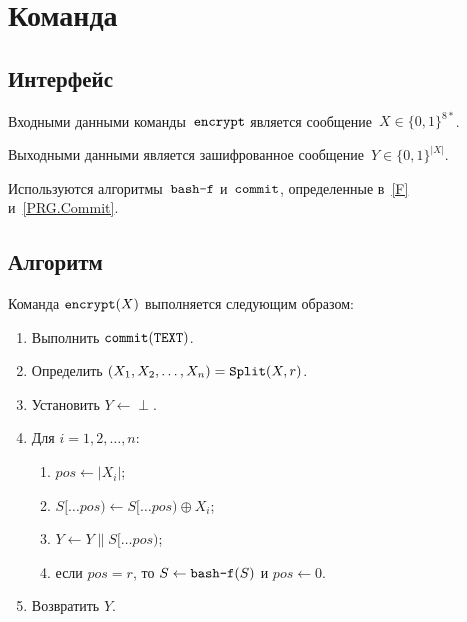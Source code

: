 \section{Команда }\label{PRG.Encrypt}

\subsection{Интерфейс}\label{PRG.Encrypt.IFace}

Входными данными команды~$\texttt{encrypt}$ является 
сообщение~$X\in\{0,1\}^{8*}$.

Выходными данными является зашифрованное сообщение~$Y\in\{0,1\}^{|X|}$.

Используются алгоритмы~$\texttt{bash-f}$ и~$\texttt{commit}$, 
определенные в~\ref{F} и~\ref{PRG.Commit}.

\subsection{Алгоритм}\label{PRG.Encrypt.Alg}

Команда $\texttt{encrypt}(X)$ выполняется следующим образом:
\begin{enumerate}
\item
Выполнить
$\texttt{commit}(\texttt{TEXT})$.
\item
Определить $(X_1,X_2,\ldots,X_n)=\mathop{\texttt{Split}}\nolimits(X,r)$.
\item
Установить $Y\leftarrow\perp$. 
\item
Для $i=1,2,\ldots,n$:
\begin{enumerate}
\item
$pos\leftarrow |X_i|$;
\item
$S[\dots pos)\leftarrow S[\dots pos)\oplus X_i$;
\item
$Y\leftarrow Y\parallel S[\dots pos)$;
\item
если $pos=r$, то 
$S\leftarrow\texttt{bash-f}(S)$ и $pos\leftarrow 0$.
\end{enumerate}
\item
Возвратить $Y$.
\end{enumerate}
